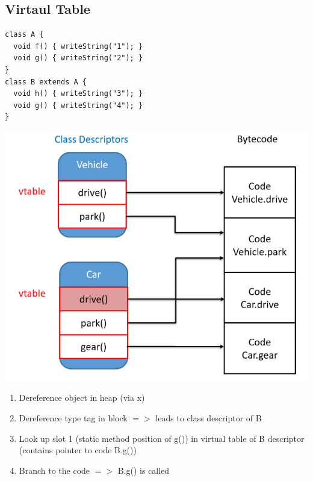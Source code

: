 \subsection{Virtaul Table}
\begin{lstlisting}
class A {
  void f() { writeString("1"); }
  void g() { writeString("2"); }
}
class B extends A {
  void h() { writeString("3"); }
  void g() { writeString("4"); }
}
\end{lstlisting}
\begin{center}
	\includegraphics[width=\columnwidth]{Images/vtable}
\end{center}

\begin{enumerate}[nosep]
	\item Dereference object in heap (via x)
	\item Dereference type tag in block $=>$ leads to class descriptor of B
	\item Look up slot 1 (static method position of g()) in virtual table of B descriptor (contains pointer to code B.g())
	\item Branch to the code $=>$ B.g() is called
\end{enumerate}